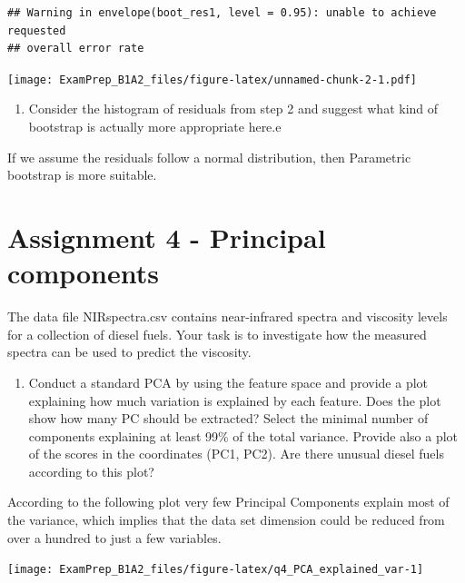 \documentclass[
]{article}
\providecommand{\tightlist}{%
  \setlength{\itemsep}{0pt}\setlength{\parskip}{0pt}}
\begin{document}
\begin{verbatim}
## Warning in envelope(boot_res1, level = 0.95): unable to achieve requested
## overall error rate
\end{verbatim}

\texttt{[image: ExamPrep\_B1A2\_files/figure-latex/unnamed-chunk-2-1.pdf]}

\begin{enumerate}
\def\labelenumi{\arabic{enumi}.}
\setcounter{enumi}{4}
\tightlist
\item
  Consider the histogram of residuals from step 2 and suggest what kind
  of bootstrap is actually more appropriate here.e
\end{enumerate}

If we assume the residuals follow a normal distribution, then Parametric
bootstrap is more suitable.

\newpage

\hypertarget{assignment-4---principal-components}{%
\section{Assignment 4 - Principal
components}\label{assignment-4---principal-components}}

The data file NIRspectra.csv contains near-infrared spectra and
viscosity levels for a collection of diesel fuels. Your task is to
investigate how the measured spectra can be used to predict the
viscosity.

\begin{enumerate}
\def\labelenumi{\arabic{enumi}.}
\tightlist
\item
  Conduct a standard PCA by using the feature space and provide a plot
  explaining how much variation is explained by each feature. Does the
  plot show how many PC should be extracted? Select the minimal number
  of components explaining at least 99\% of the total variance. Provide
  also a plot of the scores in the coordinates (PC1, PC2). Are there
  unusual diesel fuels according to this plot?
\end{enumerate}

According to the following plot very few Principal Components explain
most of the variance, which implies that the data set dimension could be
reduced from over a hundred to just a few variables.

\begin{center}\texttt{[image: ExamPrep\_B1A2\_files/figure-latex/q4\_PCA\_explained\_var-1]} \end{center}
\end{document}
